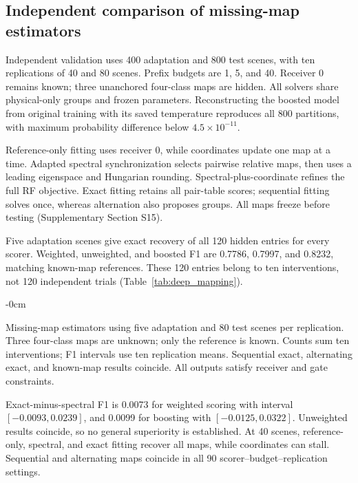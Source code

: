 \subsection{Independent comparison of missing-map estimators}\label{sec:deep_mapping}
Independent validation uses 400 adaptation and 800 test scenes, with ten replications of 40 and 80 scenes. Prefix budgets are 1, 5, and 40. Receiver 0 remains known; three unanchored four-class maps are hidden. All solvers share physical-only groups and frozen parameters. Reconstructing the boosted model from original training with its saved temperature reproduces all 800 partitions, with maximum probability difference below $4.5\times10^{-11}$.

Reference-only fitting uses receiver 0, while coordinates update one map at a time. Adapted spectral synchronization \cite{pachauri2013} selects pairwise relative maps, then uses a leading eigenspace and Hungarian rounding. Spectral-plus-coordinate refines the full RF objective. Exact fitting retains all pair-table scores; sequential fitting solves once, whereas alternation also proposes groups. All maps freeze before testing (Supplementary Section S15).

Five adaptation scenes give exact recovery of all 120 hidden entries for every scorer. Weighted, unweighted, and boosted F1 are 0.7786, 0.7997, and 0.8232, matching known-map references. These 120 entries belong to ten interventions, not 120 independent trials (Table~\ref{tab:deep_mapping}).

\begin{table}[!t]\begin{adjustwidth}{-\extralength}{0cm}
\caption{Missing-map estimators using five adaptation and 80 test scenes per replication. Three four-class maps are unknown; only the reference is known. Counts sum ten interventions; F1 intervals use ten replication means. Sequential exact, alternating exact, and known-map results coincide. All outputs satisfy receiver and gate constraints.}\label{tab:deep_mapping}
\small\setlength{\tabcolsep}{4pt}
\end{adjustwidth}\end{table}

Exact-minus-spectral F1 is 0.0073 for weighted scoring with interval $[-0.0093,0.0239]$, and 0.0099 for boosting with $[-0.0125,0.0322]$. Unweighted results coincide, so no general superiority is established. At 40 scenes, reference-only, spectral, and exact fitting recover all maps, while coordinates can stall. Sequential and alternating maps coincide in all 90 scorer--budget--replication settings.

